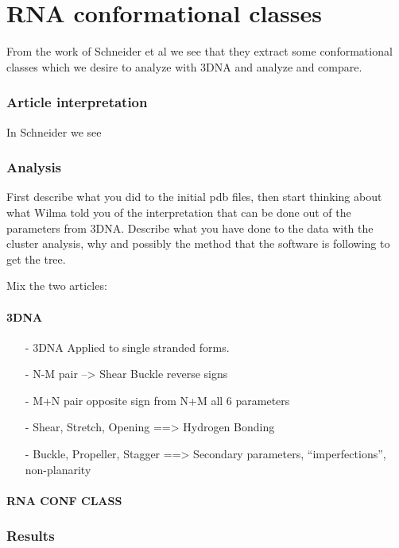 
\part{RNA conformational classes}

From the work of Schneider et al we see that they extract some conformational classes which we desire to analyze with 3DNA and analyze and compare.

\section{Article interpretation}
In Schneider \cite{schneider} we see 



\section{Analysis}
First describe what you did to the initial pdb files, then start thinking about what Wilma told you of the interpretation that can be done out of the parameters from 3DNA.
Describe what you have done to the data with the cluster analysis, why and possibly the method that the software is following to get the tree.


Mix the two articles:

\subsection{3DNA}

\begin{itemize}
\item [-]3DNA Applied to single stranded forms.
\item [-] N-M pair --> Shear Buckle reverse signs
\item [-] M+N pair opposite sign from N+M all 6 parameters
\item [-] Shear, Stretch, Opening ==> Hydrogen Bonding 
\item [-] Buckle, Propeller, Stagger ==> Secondary parameters, ``imperfections'', non-planarity


\end{itemize}



\subsection{RNA CONF CLASS}






\section{Results}















